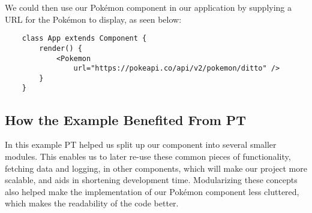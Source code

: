 We could then use our Pokémon component in our application by supplying a URL for the Pokémon to display, as seen below:

\begin{verbatim}
    class App extends Component {
        render() {
            <Pokemon
                url="https://pokeapi.co/api/v2/pokemon/ditto" />
        }
    }
\end{verbatim}

\subsection{How the Example Benefited From PT}\label{subsec:how-the-example-benefited-from-pt}

In this example PT helped us split up our component into several smaller modules.
This enables us to later re-use these common pieces of functionality, fetching data and logging, in other components, which will make our project more scalable, and aids in shortening development time.
Modularizing these concepts also helped make the implementation of our Pokémon component less cluttered, which makes the readability of the code better.
